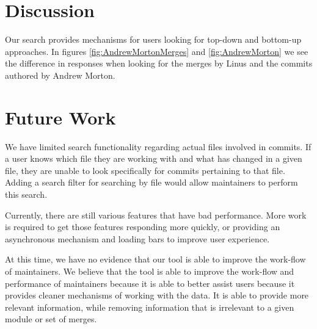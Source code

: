 \documentclass[conference, draftclsnofoot]{IEEEtran}
\begin{document}
\section{Discussion}

Our search provides mechanisms for users looking for top-down and bottom-up
approaches. In figures \ref{fig:AndrewMortonMerges} and \ref{fig:AndrewMorton}
we see the difference in responses when looking for the merges by Linus and the
commits authored by Andrew Morton.


%



\section{Future Work}
We have limited search functionality regarding actual files involved in
commits. If a user knows which file they are working with and what has changed
in a given file, they are unable to look specifically for commits pertaining to
that file. Adding a search filter for searching by file would allow maintainers
to perform this search.

Currently, there are still various features that have bad performance. More
work is required to get those features responding more quickly, or providing an
asynchronous mechanism and loading bars to improve user experience.

At this time, we have no evidence that our tool is able to improve the
work-flow of maintainers. We believe that the tool is able to improve the
work-flow and performance of maintainers because it is able to better assist
users because it provides cleaner mechanisms of working with the data. It is
able to provide more relevant information, while removing information that is
irrelevant to a given module or set of merges.
\end{document}
